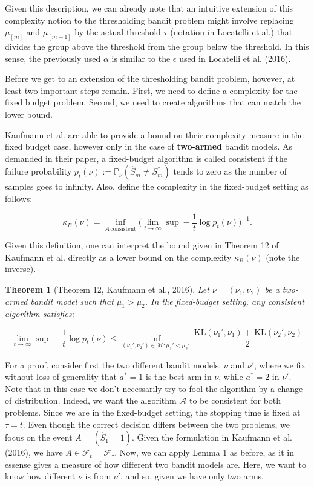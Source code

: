 \documentclass[12pt,]{article}
\newtheorem{theorem}{Theorem}
\newcommand{\KL}{\,\text{KL}}
\begin{document}
Given this description, we can already note that an intuitive extension
of this complexity notion to the thresholding bandit problem might
involve replacing \(\mu_{[m]}\) and \(\mu_{[m+1]}\) by the actual
threshold \(\tau\) (notation in Locatelli et al.) that divides the group
above the threshold from the group below the threshold. In this sense,
the previously used \(\alpha\) is similar to the \(\epsilon\) used in
Locatelli et al. (2016).

Before we get to an extension of the thresholding bandit problem,
however, at least two important steps remain. First, we need to define a
complexity for the fixed budget problem. Second, we need to create
algorithms that can match the lower bound.

Kaufmann et al. are able to provide a bound on their complexity measure
in the fixed budget case, however only in the case of \textbf{two-armed}
bandit models. As demanded in their paper, a fixed-budget algorithm is
called consistent if the failure probability
\(p_t(\nu) := \mathbb{P}_{\nu}(\hat{S}_m \neq S^*_m)\) tends to zero as
the number of samples goes to infinity. Also, define the complexity in
the fixed-budget setting as follows:

\begin{equation}
\kappa_B(\nu) = \inf_{A \, \text{consistent}} \big(\lim_{t \to \infty} \sup - \frac{1}{t} \log p_t(\nu)\big)^{-1}.
\end{equation}

Given this definition, one can interpret the bound given in Theorem 12
of Kaufmann et al. directly as a lower bound on the complexity
\(\kappa_B(\nu)\) (note the inverse).

\begin{theorem}[Theorem 12, Kaufmann et al., 2016] \label{theorem:KaufmannEtAlTheorem12}
Let $\nu = (\nu_1, \nu_2)$ be a two-armed bandit model such that $\mu_1 > \mu_2$. In the fixed-budget setting, any consistent algorithm satisfies:

\begin{equation*}
\lim_{t \to \infty} \sup - \frac{1}{t} \log p_t(\nu) \leq \inf_{(\nu_1', \nu_2') \in \mathcal{M}: \mu_1' < \mu_2'} \frac{\KL(\nu_1', \nu_1) + \KL(\nu_2', \nu_2)}{2}
\end{equation*}
\end{theorem}

For a proof, consider first the two different bandit models, \(\nu\) and
\(\nu'\), where we fix without loss of generality that \(a^* = 1\) is
the best arm in \(\nu\), while \(a^* = 2\) in \(\nu'\). Note that in
this case we don't necessarily try to fool the algorithm by a change of
distribution. Indeed, we want the algorithm \(\mathcal{A}\) to be
consistent for both problems. Since we are in the fixed-budget setting,
the stopping time is fixed at \(\tau = t\). Even though the correct
decision differs between the two problems, we focus on the event
\(A = (\hat{S}_1 = 1)\). Given the formulation in Kaufmann et al.
(2016), we have \(A \in \mathcal{F}_t = \mathcal{F}_{\tau}\). Now, we
can apply Lemma 1 as before, as it in essense gives a measure of how
different two bandit models are. Here, we want to know how different
\(\nu\) is from \(\nu'\), and so, given we have only two arms,
\end{document}
